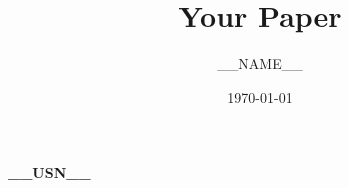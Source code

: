 \documentclass{article}
\title{Your Paper}
\author{__NAME__}  %
\date{\today}
\begin{document}
\maketitle

\textbf{__USN__}  %
  

\end{document}
